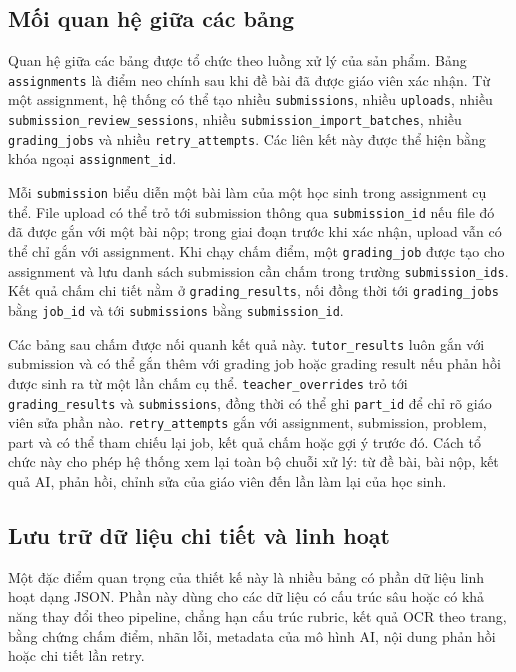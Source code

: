 \documentclass[12pt,a4paper]{article}
\begin{document}
\subsection{Mối quan hệ giữa các bảng}

Quan hệ giữa các bảng được tổ chức theo luồng xử lý của sản phẩm. Bảng
\texttt{assignments} là điểm neo chính sau khi đề bài đã được giáo viên xác
nhận. Từ một assignment, hệ thống có thể tạo nhiều \texttt{submissions}, nhiều
\texttt{uploads}, nhiều \texttt{submission\_review\_sessions}, nhiều
\texttt{submission\_import\_batches}, nhiều \texttt{grading\_jobs} và nhiều
\texttt{retry\_attempts}. Các liên kết này được thể hiện bằng khóa ngoại
\texttt{assignment\_id}.

Mỗi \texttt{submission} biểu diễn một bài làm của một học sinh trong assignment
cụ thể. File upload có thể trỏ tới submission thông qua \texttt{submission\_id}
nếu file đó đã được gắn với một bài nộp; trong giai đoạn trước khi xác nhận,
upload vẫn có thể chỉ gắn với assignment. Khi chạy chấm điểm, một
\texttt{grading\_job} được tạo cho assignment và lưu danh sách submission cần
chấm trong trường \texttt{submission\_ids}. Kết quả chấm chi tiết nằm ở
\texttt{grading\_results}, nối đồng thời tới \texttt{grading\_jobs} bằng
\texttt{job\_id} và tới \texttt{submissions} bằng \texttt{submission\_id}.

Các bảng sau chấm được nối quanh kết quả này. \texttt{tutor\_results} luôn gắn
với submission và có thể gắn thêm với grading job hoặc grading result nếu phản
hồi được sinh ra từ một lần chấm cụ thể. \texttt{teacher\_overrides} trỏ tới
\texttt{grading\_results} và \texttt{submissions}, đồng thời có thể ghi
\texttt{part\_id} để chỉ rõ giáo viên sửa phần nào. \texttt{retry\_attempts}
gắn với assignment, submission, problem, part và có thể tham chiếu lại job, kết
quả chấm hoặc gợi ý trước đó. Cách tổ chức này cho phép hệ thống xem lại toàn bộ
chuỗi xử lý: từ đề bài, bài nộp, kết quả AI, phản hồi, chỉnh sửa của giáo viên
đến lần làm lại của học sinh.

\subsection{Lưu trữ dữ liệu chi tiết và linh hoạt}

Một đặc điểm quan trọng của thiết kế này là nhiều bảng có phần dữ liệu linh hoạt
dạng JSON. Phần này dùng cho các dữ liệu có cấu trúc sâu hoặc có khả năng thay
đổi theo pipeline, chẳng hạn cấu trúc rubric, kết quả OCR theo trang, bằng chứng
chấm điểm, nhãn lỗi, metadata của mô hình AI, nội dung phản hồi hoặc chi tiết
lần retry.
\end{document}
